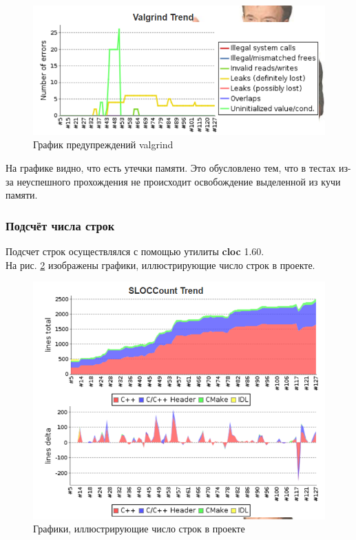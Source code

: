 \begin{figure}[H]
	\begin{center}
		\includegraphics[scale=0.5]{pics/Jenkins/valgrind.png}
	    \caption{График предупреждений valgrind} 
		\label{pic:jenkins_valgrind}
	\end{center}
\end{figure}

На графике видно, что есть утечки памяти. Это обусловлено тем, что в тестах из-за неуспешного прохождения не происходит освобождение выделенной из кучи памяти.

\subsubsection*{Подсчёт числа строк}
Подсчет строк осуществлялся с помощью утилиты \textbf{cloc} 1.60.\\
На рис. \ref{pic:jenkins_cloc} изображены графики, иллюстрирующие число строк в проекте.

\begin{figure}[H]
	\begin{center}
		\includegraphics[scale=0.5]{pics/Jenkins/cloc.png}
	    \caption{Графики, иллюстрирующие число строк в проекте} 
		\label{pic:jenkins_cloc}
	\end{center}
\end{figure}

